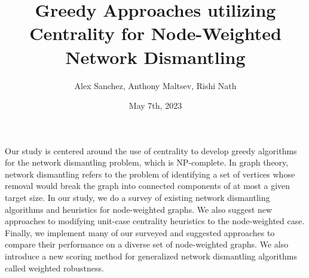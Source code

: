 \documentclass{article}
\title{Greedy Approaches utilizing Centrality for Node-Weighted Network Dismantling}
\author{Alex Sanchez, Anthony Maltsev, Rishi Nath}
\date{May 7th, 2023}
\begin{document}
\maketitle

\begin{abstract}
    
\end{abstract}
Our study is centered around the use of centrality to develop greedy algorithms for the network dismantling problem, which is NP-complete. 
In graph theory, network dismantling refers to the problem of identifying a set of vertices whose removal would break the graph into connected components of at most a given target size. 
In our study, we do a survey of existing network dismantling algorithms and heuristics for node-weighted graphs. 
We also suggest new approaches to modifying unit-case centrality heuristics to the node-weighted case. 
Finally, we implement many of our surveyed and suggested approaches to compare their performance on a diverse set of node-weighted graphs. 
We also introduce a new scoring method for generalized network dismantling algorithms called weighted robustness.
\newpage
\end{document}
